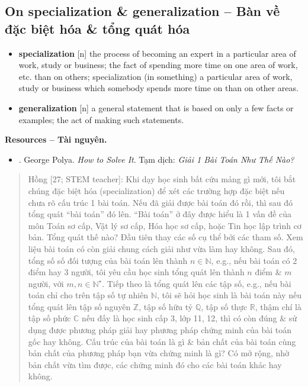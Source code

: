 \documentclass[12pt]{article}
\begin{document}
\subsection{On specialization \& generalization -- Bàn về đặc biệt hóa \& tổng quát hóa}

\begin{itemize}\sf\small
	\item \textbf{specialization} [n] the process of becoming an expert in a particular area of work, study or business; the fact of spending more time on one area of work, etc. than on others; specialization (in something) a particular area of work, study or business which somebody spends more time on than on other areas.
	\item \textbf{generalization} [n] a general statement that is based on only a few facts or examples; the act of making such statements.
\end{itemize}

\noindent\textbf{\textsf{Resources -- Tài nguyên.}}
\begin{itemize}
	\item \cite{Polya2014}. George Polya. {\it How to Solve It}. Tạm dịch: {\it Giải 1 Bài Toán Như Thế Nào?}
\end{itemize}

\begin{quotation}
	{\sf Hồng [27; STEM teacher]}: Khi dạy học sinh bất cứu mảng gì mới, tôi bắt chúng đặc biệt hóa (specialization) để xét các trường hợp đặc biệt nếu chưa rõ cấu trúc 1 bài toán. Nếu đã giải được bài toán đó rồi, thì sau đó tổng quát ``bài toán'' đó lên. ``Bài toán'' ở đây được hiểu là 1 vấn đề của môn Toán sơ cấp, Vật lý sơ cấp, Hóa học sơ cấp, hoặc Tin học lập trình cơ bản. Tổng quát thế nào? Đầu tiên thay các số cụ thể bởi các tham số. Xem liệu bài toán có còn giải chung cách giải như vừa làm hay không. Sau đó, tổng số số đối tượng của bài toán lên thành $n\in\mathbb{N}$, e.g., nếu bài toán có 2 điểm hay 3 người, tôi yêu cầu học sinh tổng quát lên thành $n$ điểm \& $m$ người, với $m,n\in\mathbb{N}^\star$. Tiếp theo là tổng quát lên các tập số, e.g., nếu bài toán chỉ cho trên tập số tự nhiên $\mathbb{N}$, tôi sẽ hỏi học sinh là bài toán này nếu tổng quát lên tập số nguyên $\mathbb{Z}$, tập số hữu tỷ $\mathbb{Q}$, tập số thực $\mathbb{R}$, thậm chí là tập số phức $\mathbb{C}$ nếu đấy là học sinh cấp 3, lớp 11, 12, thì có còn đúng \& sử dụng được phương pháp giải hay phương pháp chứng minh của bài toán gốc hay không. Cấu trúc của bài toán là gì \& bản chất của bài toán cùng bản chất của phương pháp bạn vừa chứng minh là gì? Có mở rộng, nhờ bản chất vừa tìm được, các chứng minh đó cho các bài toán khác hay không.
\end{quotation}
\end{document}
